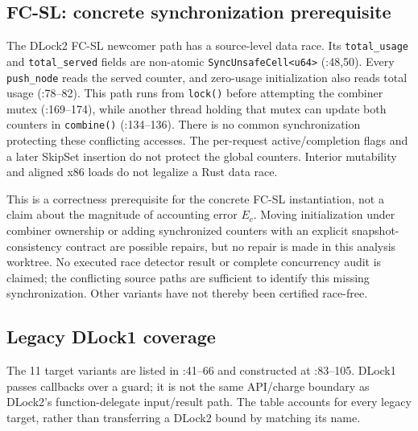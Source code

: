\subsection{FC-SL: concrete synchronization prerequisite}
\label{app:fcsl-race}
The DLock2 FC-SL newcomer path has a source-level data race. Its
\texttt{total\_usage} and \texttt{total\_served} fields are non-atomic
\texttt{SyncUnsafeCell<u64>} (:48,50).
Every \texttt{push\_node} reads the served counter, and zero-usage initialization
also reads total usage (:78--82). This path runs from \texttt{lock()} before
attempting the combiner mutex (:169--174), while another thread holding that
mutex can update both counters in \texttt{combine()} (:134--136).
There is no common synchronization protecting these conflicting accesses.
The per-request active/completion flags and a later SkipSet insertion do not
protect the global counters. Interior mutability and aligned x86 loads do
not legalize a Rust data race.

This is a correctness prerequisite for the concrete FC-SL instantiation,
not a claim about the magnitude of accounting error $E_c$. Moving initialization
under combiner ownership or adding synchronized counters with an explicit
snapshot-consistency contract are possible repairs, but no repair is made in
this analysis worktree. No executed race detector result or complete
concurrency audit is claimed; the conflicting source paths are sufficient
to identify this missing synchronization. Other variants have not thereby
been certified race-free.

\subsection{Legacy DLock1 coverage}
The 11 target variants are listed in
:41--66 and constructed at :83--105.
DLock1 passes callbacks over a guard; it is not the same API/charge boundary as
DLock2's function-delegate input/result path. The table accounts for every
legacy target, rather than transferring a DLock2 bound by matching its name.

